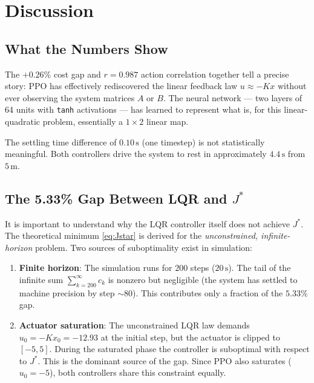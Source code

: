 \documentclass[11pt, a4paper]{article}
\begin{document}
\section{Discussion}

\subsection{What the Numbers Show}

The $+0.26\%$ cost gap and $r=0.987$ action correlation together tell a
precise story: PPO has effectively rediscovered the linear feedback law
$u \approx -Kx$ without ever observing the system matrices $A$ or $B$.
The neural network — two layers of 64 units with \texttt{tanh}
activations — has learned to represent what is, for this linear-quadratic
problem, essentially a $1\times2$ linear map.

The settling time difference of $0.10\,\mathrm{s}$ (one timestep) is
not statistically meaningful. Both controllers drive the system to rest
in approximately $4.4\,\mathrm{s}$ from $5\,\mathrm{m}$.

\subsection{The 5.33\% Gap Between LQR and $J^*$}

It is important to understand why the LQR controller itself does not
achieve $J^*$. The theoretical minimum \eqref{eq:Jstar} is derived for
the \emph{unconstrained, infinite-horizon} problem. Two sources of
suboptimality exist in simulation:

\begin{enumerate}[leftmargin=2em]
  \item \textbf{Finite horizon}: The simulation runs for $200$ steps
        ($20\,\mathrm{s}$). The tail of the infinite sum
        $\sum_{k=200}^{\infty} c_k$ is nonzero but negligible (the
        system has settled to machine precision by step $\sim$80).
        This contributes only a fraction of the $5.33\%$ gap.

  \item \textbf{Actuator saturation}: The unconstrained LQR law demands
        $u_0 = -Kx_0 = -12.93$ at the initial step, but the actuator
        is clipped to $[-5, 5]$. During the saturated phase the controller
        is suboptimal with respect to $J^*$. This is the dominant source
        of the gap. Since PPO also saturates ($u_0 = -5$), both
        controllers share this constraint equally.
\end{enumerate}
\end{document}
